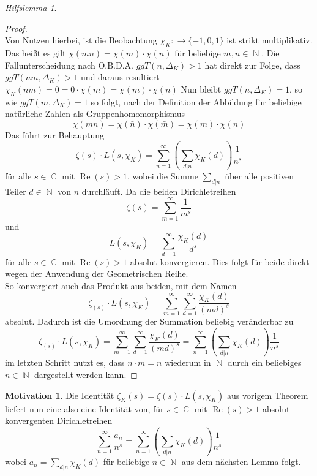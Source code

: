 \documentclass[10pt,a4paper]{article}
\theoremstyle{plain}
\theoremstyle{definition}
\newtheorem*{mot}{Motivation}
\theoremstyle{remark}
\newtheorem{hilfslem}{Hilfslemma}
\DeclareMathOperator{\C}{\mathbb{C}}
\DeclareMathOperator{\N}{\mathbb{N}}
\DeclareMathOperator{\re}{Re}
\begin{document}
\begin{hilfslem}
\begin{proof}
 \\
Von Nutzen hierbei, ist die Beobachtung $\chi_K \colon \rightarrow \{-1,0,1\}$ ist strikt multiplikativ. Das heißt es gilt $\chi(mn)=\chi(m)\cdot\chi(n)$ für beliebige $m,n \in \N$. Die Fallunterscheidung nach O.B.D.A. $ggT(n,\Delta_K)>1$ hat direkt zur Folge, dass $ggT(nm,\Delta_K)>1$ und daraus resultiert $\chi_K(nm)=0=0\cdot \chi(m)= \chi(m)\cdot \chi(n)$
Nun bleibt $ggT(n,\Delta_K)=1$, so wie $ggT(m,\Delta_K)=1$ so folgt, nach der Definition der Abbildung für beliebige natürliche Zahlen als Gruppenhomomorphismus $$\chi(mn)=\chi(\bar{n})\cdot \chi(\bar{m})= \chi(m)\cdot \chi(n)$$
 Das führt zur Behauptung $$\zeta(s)\cdot L(s,\chi_K) = \sum_{n=1}^{\infty}(\sum_{d|n}\chi_K(d))\frac{1}{n^s}$$ für alle $s \in \C $ mit $ \re(s) >1$, wobei die Summe $\sum_{d|n}$ über alle positiven Teiler $d \in \N$ von $n$ durchläuft. Da die beiden Dirichletreihen $$\zeta(s) = \sum_{m=1}^{\infty}\frac{1}{m^s} $$ und $$L(s,\chi_K)= \sum_{d=1}^{\infty}\frac{\chi_K(d)}{d^s}$$ für alle $s \in \C $ mit $ \re(s) >1$ absolut konvergieren. Dies folgt für beide direkt wegen der Anwendung der Geometrischen Reihe.
 \\
 So konvergiert auch das Produkt aus beiden, mit dem Namen $$\zeta_(s) \cdot L(s,\chi_K) = \sum_{m=1}^{\infty} \sum_{d=1}^{\infty}\frac{\chi_K(d)}{(md)^s}$$ absolut.
 Dadurch ist die Umordnung der Summation beliebig veränderbar zu $$\zeta_(s) \cdot L(s,\chi_K)=\sum_{m=1}^{\infty} \sum_{d=1}^{\infty}\frac{\chi_K(d)}{(md)^s}= \sum_{n=1}^{\infty}(\sum_{d|n}\chi_K(d))\frac{1}{n^s}$$ im letzten Schritt nutzt es, dass $n \cdot m = n$ wiederum in $\N$ durch ein beliebiges $n \in \N$ dargestellt werden kann.
 \end{proof}
 \end{hilfslem}

 
\begin{mot}
Die Identität  $\zeta_K(s) = \zeta(s)\cdot L(s,\chi_K) $ aus vorigem Theorem liefert nun eine also eine Identität von, für $s \in \C $ mit $ \re(s) > 1$ absolut konvergenten Dirichletreihen$$ \sum_{n=1}^{\infty}\frac{a_n}{n^s}= \sum_{n=1}^{\infty}(\sum_{d|n}\chi_K(d))\frac{1}{n^s}$$
wobei $a_n = \sum_{d|n}\chi_K(d)$ für beliebige $n \in \N$ aus dem nächsten Lemma folgt.
 \end{mot}
 
\end{document}
